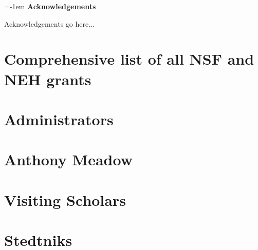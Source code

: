 {\large \parindent=-1em \textbf{Acknowledgements}}
\vspace{0.25em}

Acknowledgements go here...

\section{Comprehensive list of all NSF and NEH grants}
\section{Administrators}
\section{Anthony Meadow}
\section{Visiting Scholars}
\section{Stedtniks}
